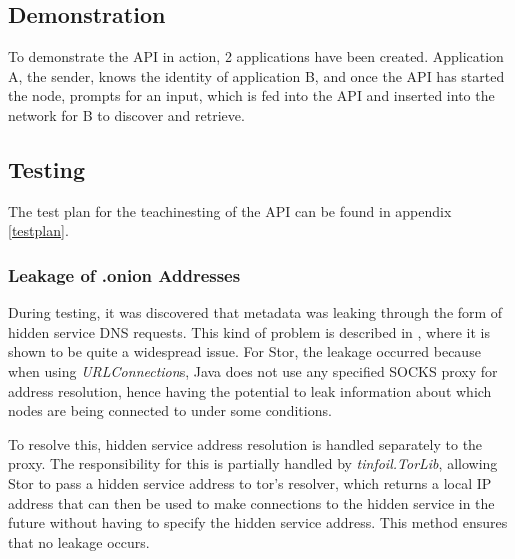 	\subsection{Demonstration}
		To demonstrate the API in action, 2 applications have been created. Application A, the sender, knows the identity of application B, and once the API has started the node, prompts for an input, which is fed into the API and inserted into the network for B to discover and retrieve.
	\subsection{Testing}
		The test plan for the teachinesting of the API can be found in appendix \ref{testplan}.
		\subsubsection*{Leakage of .onion Addresses}
			During testing, it was discovered that metadata was leaking through the form of hidden service DNS requests. This kind of problem is described in \cite{Thomas:2014:MLO:2665943.2665951}, where it is shown to be quite a widespread issue. For Stor, the leakage occurred because when using \textit{URLConnection}s, Java does not use any specified SOCKS proxy for address resolution, hence having the potential to leak information about which nodes are being connected to under some conditions.
			
			To resolve this, hidden service address resolution is handled separately to the proxy. The responsibility for this is partially handled by \textit{tinfoil.TorLib}, allowing Stor to pass a hidden service address to tor's resolver, which returns a local IP address that can then be used to make connections to the hidden service in the future without having to specify the hidden service address. This method ensures that no leakage occurs.